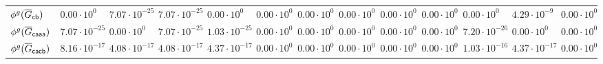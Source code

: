\begin{table}[!t]
{\begin{tabular}{lllllllllllll}
		$\phi^{g}(\overline{G}_{\mathsf{cb}})$   & $0.00\cdot 10^{0}$   & $7.07\cdot 10^{-25}$ & $7.07\cdot 10^{-25}$ & $0.00\cdot 10^{0}$   & $0.00\cdot 10^{0}$& $0.00\cdot 10^{0}$& $0.00\cdot 10^{0}$& $0.00\cdot 10^{0}$& $0.00\cdot 10^{0}$    &$0.00\cdot 10^{0}$ & $4.29\cdot 10^{-9}$& $0.00\cdot 10^{0}$ \\
		$\phi^{g}(\overline{G}_{\mathsf{caaa}})$ & $7.07\cdot 10^{-25}$ & $0.00\cdot 10^{0}$   & $7.07\cdot 10^{-25}$ & $1.03\cdot 10^{-25}$ & $0.00\cdot 10^{0}$& $0.00\cdot 10^{0}$& $0.00\cdot 10^{0}$& $0.00\cdot 10^{0}$& $0.00\cdot 10^{0}$    &$7.20\cdot 10^{-26}$ & $0.00\cdot 10^{0}$& $0.00\cdot 10^{0}$ \\
		\bottomrule
				$\phi^{g}(\overline{G}_{\mathsf{cacb}})$ & $8.16\cdot10^{-17}$ & $4.08\cdot 10^{-17}$ & $4.08\cdot10^{-17}$ & $4.37\cdot 10^{-17}$ &  $0.00\cdot 10^{0}$& $0.00\cdot 10^{0}$& $0.00\cdot 10^{0}$ & $0.00\cdot 10^{0}$ & $0.00\cdot 10^{0}$    & $1.03\cdot10^{-16}$ & $4.37\cdot10^{-17}$& $0.00\cdot 10^{0}$ \\
		\bottomrule
	\end{tabular}}

\end{table}
